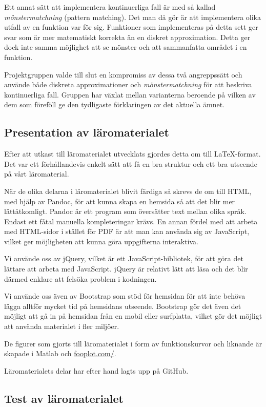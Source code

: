 \documentclass[12pt,a4paper,twoside,openright]{article}
\begin{document}
Ett annat sätt att implementera kontinuerliga fall är med så kallad
\textit{mönstermatchning} (pattern
 matching). Det man då gör är att implementera olika
utfall av en funktion var för sig. Funktioner som implementeras på
detta sett ger svar som är mer matematiskt korrekta än en diskret
approximation. Detta ger dock inte samma möjlighet att se mönster och
att sammanfatta området i en funktion.

Projektgruppen valde till slut en kompromiss av dessa två angreppssätt
och använde både diskreta approximationer och \textit{mönstermatchning} 
för att beskriva kontinuerliga fall. Gruppen har växlat
mellan varianterna beroende på vilken av dem som föreföll ge den
tydligaste förklaringen av det aktuella ämnet.

\subsection{Presentation av läromaterialet}
Efter att utkast till läromaterialet utvecklats gjordes detta om till
LaTeX-format. Det var ett förhållandevis enkelt sätt att få en bra 
struktur och ett bra utseende på vårt läromaterial.

När de olika delarna i läromaterialet blivit färdiga så skrevs de
om till HTML, med hjälp av Pandoc, för att kunna skapa en hemsida så
att det blir mer lätt\-åtkomligt. Pandoc är ett program som översätter
text mellan olika språk. Endast ett fåtal manuella kompleteringar krävs.
En annan fördel med att arbeta med HTML-sidor i stället för
PDF är att man kan använda sig av JavaScript, vilket ger möjligheten
att kunna göra uppgifterna interaktiva.

Vi använde oss av jQuery, vilket är ett JavaScript-bibliotek, för att
göra det lättare att arbeta med JavaScript. jQuery är relativt
lätt att läsa och det blir därmed enklare att felsöka problem i
kodningen. 

Vi använde oss även av Bootstrap som stöd för hemsidan för att inte 
behöva lägga alltför mycket tid på hemsidans utseende. Bootstrap gör
det även det möjligt att
gå in på hemsidan från en mobil eller surfplatta, vilket gör det
möjligt att använda materialet i fler miljöer.

De figurer som gjorts till läromaterialet i form av funktionskurvor
och liknande är skapade i Matlab och \url{fooplot.com/}.

Läromaterialets delar har efter hand lagts upp på GitHub. 

\subsection{Test av läromaterialet}
\label{sec:test}
\end{document}
